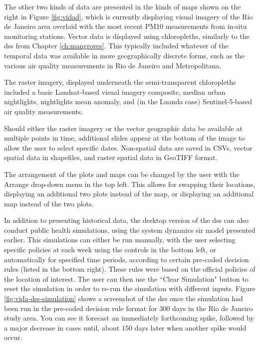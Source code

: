 The other two kinds of data are presented in the kinds of maps shown on the right in Figure \ref{fig:vidad}, which is currently displaying visual imagery of the Rio de Janeiro area overlaid with the most recent PM10 measurements from in-situ monitoring stations. Vector data is displayed using chloropleths, similarly to the \ac{dss} from Chapter \ref{ch:mangroves}. This typically included whatever of the temporal data was available in more geographically discrete forms, such as the various air quality measurements in Rio de Janeiro and Metropolitana.

The raster imagery, displayed underneath the semi-transparent chloropleths included a basic Landsat-based visual imagery composite, median urban nightlights, nightlights mean anomaly, and (in the Luanda case) Sentinel-5-based air quality measurements.

Should either the raster imagery or the vector geographic data be available at multiple points in time, additional slides appear at the bottom of the image to allow the user to select specific dates. Non-spatial data are saved in CSVs, vector spatial data in shapefiles, and raster spatial data in GeoTIFF format.

The arrangement of the plots and maps can be changed by the user with the Arrange drop-down menu in the top left. This allows for swapping their locations, displaying an additional two plots instead of the map, or displaying an additional map instead of the two plots.

In addition to presenting historical data, the desktop version of the \ac{dss} can also conduct public health simulations, using the system dynamics \ac{sir} model presented earlier. This simulations can either be run manually, with the user selecting specific policies at each week using the controls in the bottom left, or automatically for specified time periods, according to certain pre-coded decision rules (listed in the bottom right). These rules were based on the official policies of the location of interest. The user can then use the ``Clear Simulation" button to reset the simulation in order to re-run the simulation with different inputs. Figure \ref{fig:vida-dss-simulation} shows a screenshot of the \ac{dss} once the simulation had been run in the pre-coded decision rule format for 300 days in the Rio de Janeiro study area. You can see it forecast an immediately forthcoming spike, followed by a major decrease in cases until, about 150 days later when another spike would occur.

